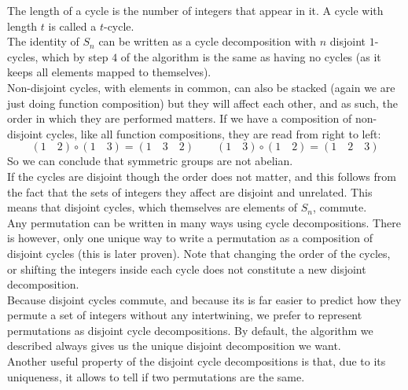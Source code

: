 \documentclass[12pt]{article}
\begin{document}
    The length of a cycle is the number of integers that appear in it.
    A cycle with length $t$ is called a $t$-cycle. \\
    The identity of $S_n$ can be written as a cycle decomposition
    with $n$ disjoint $1$-cycles,
    which by step $4$ of the algorithm is the same as
    having no cycles (as it keeps all elements mapped to themselves). \\

    Non-disjoint cycles, with elements in common,
    can also be stacked
    (again we are just doing function composition)
    but they will affect each other,
    and as such, the order in which they are performed matters.
    If we have a composition of non-disjoint cycles,
    like all function compositions,
    they are read from right to left:
    \[ (1 \quad 2) \circ (1 \quad 3) = (1 \quad 3 \quad 2)
    \qquad (1 \quad 3) \circ (1 \quad 2) = (1 \quad 2 \quad 3) \]
    So we can conclude that symmetric groups are not abelian. \\

    If the cycles are disjoint though the order does not matter,
    and this follows from the fact that the sets of integers
    they affect are disjoint and unrelated.
    This means that disjoint cycles,
    which themselves are elements of $S_n$, commute. \\
    
    Any permutation can be written in many ways using cycle decompositions.
    There is however,
    only one unique way to write a permutation as a composition
    of disjoint cycles
    (this is later proven).
    Note that changing the order of the cycles,
    or shifting the integers inside each cycle does not constitute
    a new disjoint decomposition. \\
    Because disjoint cycles commute,
    and because its is far easier to predict
    how they permute a set of integers without any intertwining,
    we prefer to represent permutations as disjoint cycle decompositions.
    By default, the algorithm we described always gives us
    the unique disjoint decomposition we want. \\

    Another useful property of the disjoint cycle decompositions
    is that,
    due to its uniqueness, it allows to tell if two permutations
    are the same. \\
\end{document}
